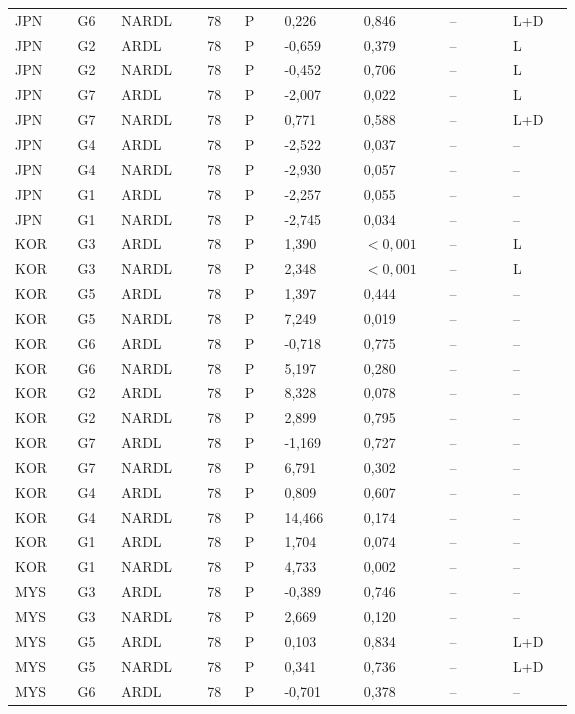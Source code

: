 {\begin{longtable}{p{0.075\linewidth}p{0.05\linewidth}p{0.09\linewidth}p{0.04\linewidth}p{0.05\linewidth}p{0.1\linewidth}p{0.085\linewidth}p{0.085\linewidth}p{0.075\linewidth}}
JPN & G6 & NARDL & 78 & P & 0,226 & 0,846 & -- & L+D\\
JPN & G2 & ARDL & 78 & P & -0,659 & 0,379 & -- & L\\
JPN & G2 & NARDL & 78 & P & -0,452 & 0,706 & -- & L\\
JPN & G7 & ARDL & 78 & P & -2,007 & 0,022 & -- & L\\
JPN & G7 & NARDL & 78 & P & 0,771 & 0,588 & -- & L+D\\
JPN & G4 & ARDL & 78 & P & -2,522 & 0,037 & -- & --\\
JPN & G4 & NARDL & 78 & P & -2,930 & 0,057 & -- & --\\
JPN & G1 & ARDL & 78 & P & -2,257 & 0,055 & -- & --\\
JPN & G1 & NARDL & 78 & P & -2,745 & 0,034 & -- & --\\
KOR & G3 & ARDL & 78 & P & 1,390 & \(<0{,}001\) & -- & L\\
KOR & G3 & NARDL & 78 & P & 2,348 & \(<0{,}001\) & -- & L\\
KOR & G5 & ARDL & 78 & P & 1,397 & 0,444 & -- & --\\
KOR & G5 & NARDL & 78 & P & 7,249 & 0,019 & -- & --\\
KOR & G6 & ARDL & 78 & P & -0,718 & 0,775 & -- & --\\
KOR & G6 & NARDL & 78 & P & 5,197 & 0,280 & -- & --\\
KOR & G2 & ARDL & 78 & P & 8,328 & 0,078 & -- & --\\
KOR & G2 & NARDL & 78 & P & 2,899 & 0,795 & -- & --\\
KOR & G7 & ARDL & 78 & P & -1,169 & 0,727 & -- & --\\
KOR & G7 & NARDL & 78 & P & 6,791 & 0,302 & -- & --\\
KOR & G4 & ARDL & 78 & P & 0,809 & 0,607 & -- & --\\
KOR & G4 & NARDL & 78 & P & 14,466 & 0,174 & -- & --\\
KOR & G1 & ARDL & 78 & P & 1,704 & 0,074 & -- & --\\
KOR & G1 & NARDL & 78 & P & 4,733 & 0,002 & -- & --\\
MYS & G3 & ARDL & 78 & P & -0,389 & 0,746 & -- & --\\
MYS & G3 & NARDL & 78 & P & 2,669 & 0,120 & -- & --\\
MYS & G5 & ARDL & 78 & P & 0,103 & 0,834 & -- & L+D\\
MYS & G5 & NARDL & 78 & P & 0,341 & 0,736 & -- & L+D\\
MYS & G6 & ARDL & 78 & P & -0,701 & 0,378 & -- & --\\

\end{longtable}}
